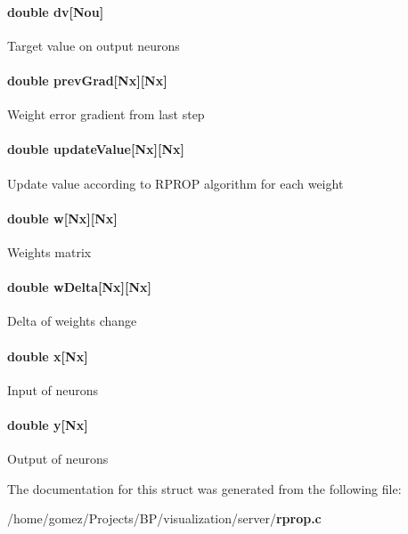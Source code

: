 \paragraph[{dv}]{\setlength{\rightskip}{0pt plus 5cm}double dv[{\bf Nou}]}\label{structann__t_a3cd26d516c0d78e0bd8e83f7b5d96056}
Target value on output neurons 
\paragraph[{prev\+Grad}]{\setlength{\rightskip}{0pt plus 5cm}double prev\+Grad[Nx][Nx]}\label{structann__t_ae668825bd99ec5a8e701cd34833d92c8}
Weight error gradient from last step 
\paragraph[{update\+Value}]{\setlength{\rightskip}{0pt plus 5cm}double update\+Value[Nx][Nx]}\label{structann__t_a56f1cf095bad5da7e0c944dd9727293a}
Update value according to R\+P\+R\+O\+P algorithm for each weight 
\paragraph[{w}]{\setlength{\rightskip}{0pt plus 5cm}double w[Nx][Nx]}\label{structann__t_aee905c93142ba709a90118c788622185}
Weights matrix 
\paragraph[{w\+Delta}]{\setlength{\rightskip}{0pt plus 5cm}double w\+Delta[Nx][Nx]}\label{structann__t_a19e899724a3a7ab9150e22e0d48ebc3e}
Delta of weights change 
\paragraph[{x}]{\setlength{\rightskip}{0pt plus 5cm}double x[Nx]}\label{structann__t_ac566dbcdd25e058c1e82f59d63dfd12b}
Input of neurons 
\paragraph[{y}]{\setlength{\rightskip}{0pt plus 5cm}double y[Nx]}\label{structann__t_adec9cbbd838a286742a4ae286bff0e30}
Output of neurons 

The documentation for this struct was generated from the following file\+:\begin{DoxyCompactItemize}
\item 
/home/gomez/\+Projects/\+B\+P/visualization/server/{\bf rprop.\+c}\end{DoxyCompactItemize}

